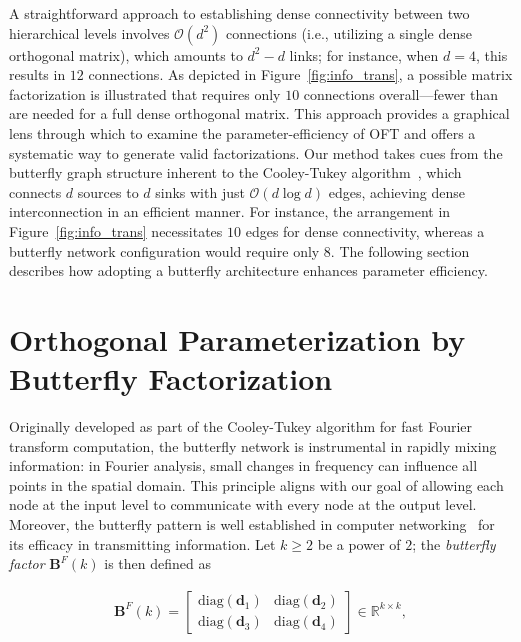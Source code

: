 A straightforward approach to establishing dense connectivity between two hierarchical levels involves $\mathcal{O}(d^2)$ connections (i.e., utilizing a single dense orthogonal matrix), which amounts to $d^2-d$ links; for instance, when $d=4$, this results in $12$ connections. As depicted in Figure~\ref{fig:info_trans}, a possible matrix factorization is illustrated that requires only $10$ connections overall—fewer than are needed for a full dense orthogonal matrix. This approach provides a graphical lens through which to examine the parameter-efficiency of OFT and offers a systematic way to generate valid factorizations. Our method takes cues from the butterfly graph structure inherent to the Cooley-Tukey algorithm~\cite{cooley1965algorithm}, which connects $d$ sources to $d$ sinks with just $\mathcal{O}(d\log d)$ edges, achieving dense interconnection in an efficient manner. For instance, the arrangement in Figure~\ref{fig:info_trans} necessitates $10$ edges for dense connectivity, whereas a butterfly network configuration would require only $8$. The following section describes how adopting a butterfly architecture enhances parameter efficiency.

\section{Orthogonal Parameterization by Butterfly Factorization}

Originally developed as part of the Cooley-Tukey algorithm for fast Fourier transform computation, the butterfly network is instrumental in rapidly mixing information: in Fourier analysis, small changes in frequency can influence all points in the spatial domain. This principle aligns with our goal of allowing each node at the input level to communicate with every node at the output level. Moreover, the butterfly pattern is well established in computer networking~\cite{solihin2015fundamentals,li2011linear} for its efficacy in transmitting information. Let $k \geq 2$ be a power of $2$; the \emph{butterfly factor} $\bm{B}^F(k)$ is then defined as

\begin{equation}\label{eq:but_factor}
\begin{aligned}
    \bm{B}^F(k)=\begin{bmatrix}
    \text{diag}(\bm{d}_1) & \text{diag}(\bm{d}_2) \\
    \text{diag}(\bm{d}_3) & \text{diag}(\bm{d}_4)
    \end{bmatrix}\in\mathbb{R}^{k\times k},
\end{aligned}
\end{equation}

